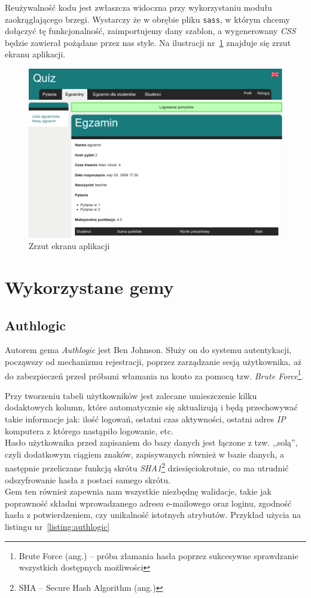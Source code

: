\documentclass[12pt,twoside]{report}
\begin{document}
Reużywalność kodu jest zwłaszcza widoczna przy wykorzystaniu modułu zaokrąglającego
brzegi. Wystarczy że w obrębie pliku \texttt{sass}, w którym chcemy dołączyć tę
funkcjonalność, zaimportujemy dany szablon, a wygenerowany \emph{CSS} będzie zawierał
pożądane przez nas style. Na ilustracji nr~\ref{fig:layout} znajduje się zrzut ekranu
aplikacji.

\begin{figure}[ht]
  \begin{center}
    \includegraphics[width=1\linewidth]{images/layout.png}
  \end{center}
  \caption{Zrzut ekranu aplikacji}
  \label{fig:layout}
\end{figure}

\section{Wykorzystane gemy}
\subsection{Authlogic}\label{sec:authlogic}
Autorem gema \emph{Authlogic} jest Ben Johnson. Służy on do systemu autentykacji,
począwszy od mechanizmu rejestracji, poprzez zarządzanie sesją użytkownika, aż do
zabezpieczeń przed próbami włamania na konto za pomocą tzw. \emph{Brute
Force}\footnote{Brute Force (ang.) -- próba złamania hasła poprzez sukcesywne sprawdzanie
wszystkich dostępnych możliwości}.


Przy tworzeniu tabeli użytkowników jest zalecane umieszczenie kilku dodaktowych kolumn,
które automatycznie się aktualizują i będą przechowywać takie informacje jak: ilość
logowań, ostatni czas aktywności, ostatni adres \emph{IP} komputera z którego nastąpiło
logowanie, etc.\\
Hasło użytkownika przed zapisaniem do bazy danych jest łączone z tzw. ,,solą'', czyli
dodatkowym ciągiem znaków, zapisywanych również w bazie danych, a następnie przeliczane
funkcją skrótu \emph{SHA1}\footnote{SHA -- Secure Hash Algorithm (ang.)}
dziesięciokrotnie, co ma utrudnić odszyfrowanie hasła z postaci samego skrótu.\\
Gem ten również zapewnia nam wszystkie niezbędnę walidacje, takie jak poprawność składni
wprowadzanego adresu e-mailowego oraz loginu, zgodność hasła z potwierdzeniem, czy
unikalność istotnych atrybutów. Przykład użycia na listingu nr~\ref{listing:authlogic}
\end{document}
